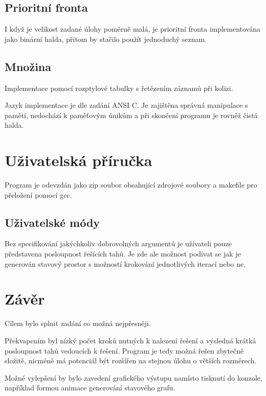 \documentclass[11pt]{article}
\begin{document}
\subsection{Prioritní fronta}
I když je velikost zadané úlohy poměrně malá, je prioritní fronta
implementována jako binární halda, přitom by stačilo použít jednoduchý seznam.

\subsection{Množina}
Implementace pomocí rozptylové tabulky s řetězením záznamů při kolizi.

Jazyk implementace je dle zadání ANSI C. Je zajištěna správná manipulace s
pamětí, nedochází k paměťovým únikům a při skončení programu je rovněž čistá
halda.


\section{Uživatelská příručka}
Program je odevzdán jako zip soubor obsahující zdrojové soubory a makefile pro
přeložení pomocí gcc.

\subsection{Uživatelské módy}
Bez specifikování jakýchkoliv dobrovolných argumentů je uživateli pouze
představena posloupnost řešících tahů. Je zde ale možnost podívat se jak je
generován stavový prostor s možností krokování jednotlivých iterací nebo ne.


\section{Závěr}
Cílem bylo splnit zadání co možná nejpřesněji. 

Překvapením byl nízký počet kroků nutných k nalezení řešení a výsledná krátká
posloupnost tahů vedoucích k řešení. Program je tedy možná řešen zbytečně
složitě, nicméně má potenciál být rozšířen na stejnou úlohu o větších
rozměrech.

Možné vylepšení by bylo zavedení grafického výstupu namísto tisknutí do konzole,
například formou animace generování stavového grafu.
\end{document}
